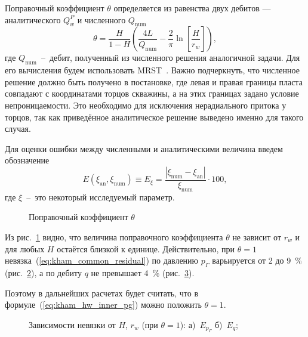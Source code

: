 \documentclass{article}
\begin{document}
Поправочный коэффициент $\theta$ определяется из равенства двух дебитов —
аналитического $Q_w^P$ и численного $Q_{\text{num}}$
\begin{equation}
  \displaystyle
  \theta = \dfrac{H}{1-H} \left(\dfrac{4L}{Q_{\text{num}}}
  - \dfrac{2}{\pi} \ln \left[\dfrac{H}{r_w}\right]\right),
  \label{eq:kham_hw_inner_theta}
\end{equation}
где $Q_{\text{num}}$~--~дебит, полученный из численного решения аналогичной задачи. Для его вычисления будем использовать MRST~\cite{lit:kham_mrst}.
Важно подчеркнуть, что численное решение должно быть получено в постановке,
где левая и правая границы пласта совпадают с координатами торцов скважины,
а на этих границах задано условие непроницаемости.
Это необходимо для исключения нерадиального притока у торцов,
так как приведённое аналитическое решение выведено именно для такого случая.

Для оценки ошибки между численными и аналитическими величина введем обозначение
\begin{equation}
  \displaystyle
  E \left(\xi_{\text{an}}, \xi_{\text{num}}\right) \equiv E_{\xi} = \dfrac{ \left| \xi_{\text{num}} - \xi_{\text{an}} \right| }{\xi_{\text{num}}} \cdot 100,
  \label{eq:kham_common_residual}
\end{equation}
где $\xi$~--~это некоторый исследуемый параметр.

\begin{figure}[!ht]
  \centering
  
  \caption{Поправочный коэффициент $\theta$}
  \label{fig:kham_hw_inner_theta_map}
\end{figure}

Из рис.~\ref{fig:kham_hw_inner_theta_map} видно, что величина поправочного коэффициента $\theta$ не зависит от $r_w$ и для любых $H$ остаётся близкой к единице.
Действительно, при $\theta=1$ невязка~(\ref{eq:kham_common_residual}) по давлению $p_{\Gamma}$ варьируется от 2 до 9~\% (рис.~\ref{fig:kham_hw_inner_epg_map}), а по дебиту $q$ не превышает 4~\% (рис.~\ref{fig:kham_hw_inner_eq_map}).

Поэтому в дальнейших расчетах будет считать, что в формуле~(\ref{eq:kham_hw_inner_pg}) можно положить $\theta=1$.

\begin{figure}[!ht]
  \centering
  \begin{subfigure}{0.48\textwidth}
    \centering
    
    \caption{}
    \label{fig:kham_hw_inner_epg_map}
  \end{subfigure}
  \hfill
  \begin{subfigure}{0.48\textwidth}
    \centering
    
    \caption{}
    \label{fig:kham_hw_inner_eq_map}
  \end{subfigure}
  \caption{
    Зависимости невязки от $H$, $r_w$ (при $\theta=1$):
  а)~$E_{p_{\Gamma}}$
б)~$E_q$;
}
\label{fig:kham_hw_inner_theta_epg_maps}
\end{figure}
\end{document}
